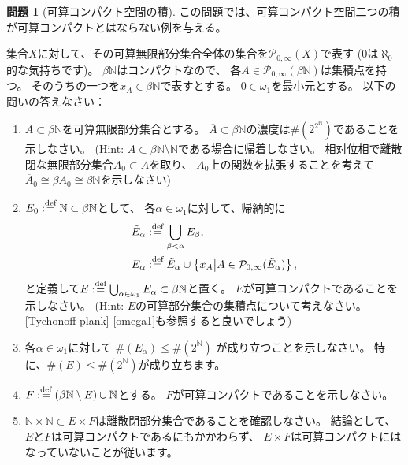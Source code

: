 \documentclass[uplatex]{jsarticle}
\theoremstyle{definition}
\newtheorem{prob}[prob]{問題}
\newcommand{\dfn}{:\overset{\mbox{{\scriptsize def}}}{=}}
\newcommand{\N}{\mathbb{N}}
\newcommand{\mcP}{\mathcal{P}}
\begin{document}
\begin{prob}[可算コンパクト空間の積]\label{prod cntb cpt}
  この問題では、可算コンパクト空間二つの積が可算コンパクトとはならない例を与える。

  集合\(X\)に対して、その可算無限部分集合全体の集合を\(\mcP_{0,\infty}(X)\)で表す
  (\(0\)は\(\aleph_0\)的な気持ちです)。
  \(\beta \N\)はコンパクトなので、
  各\(A\in \mcP_{0,\infty}(\beta \N)\)は集積点を持つ。
  そのうちの一つを\(x_A\in \beta \N\)で表すとする。
  \(0\in\omega_1\)を最小元とする。
  以下の問いの答えなさい：
  \begin{enumerate}
    \item
    \(A\subset \beta \N\)を可算無限部分集合とする。
    \(\overline{A}\subset \beta \N\)の濃度は\(\#(2^{2^{\N}})\)であることを示しなさい。
    (Hint: \(A\subset \beta \N\setminus \N\)である場合に帰着しなさい。
    相対位相で離散閉な無限部分集合\(A_0\subset A\)を取り、
    \(A_0\)上の関数を拡張することを考えて
    \(\overline{A}_0\cong \beta A_0 \cong \beta \N\)を示しなさい)
    \item
    \(E_0\dfn \N\subset \beta \N\)として、
    各\(\alpha \in \omega_1\)に対して、帰納的に
    \begin{align*}
      \tilde{E}_{\alpha} &\dfn \bigcup_{\beta<\alpha}E_{\beta}, \\
      E_{\alpha} &\dfn \tilde{E}_{\alpha} \cup
      \left\{ x_A \middle| A \in \mcP_{0,\infty}(\tilde{E}_{\alpha})\right\},
    \end{align*}
    と定義して\(E\dfn \bigcup_{\alpha\in\omega_1} E_{\alpha}\subset \beta \N\)と置く。
    \(E\)が可算コンパクトであることを示しなさい。
    (Hint: \(E\)の可算部分集合の集積点について考えなさい。
    \autoref{Tychonoff plank} \ref{omega1}も参照すると良いでしょう)
    \item
    各\(\alpha\in\omega_1\)に対して
    \(\#(E_{\alpha}) \leq \#(2^{\N})\)
    が成り立つことを示しなさい。
    特に、\(\#(E) \leq \#(2^{\N})\)が成り立ちます。
    \item
    \(F \dfn (\beta \N \setminus E)\cup \N\)とする。
    \(F\)が可算コンパクトであることを示しなさい。
    \item
    \(\N\times \N\subset E\times F\)は離散閉部分集合であることを確認しなさい。
    結論として、\(E\)と\(F\)は可算コンパクトであるにもかかわらず、
    \(E\times F\)は可算コンパクトにはなっていないことが従います。
  \end{enumerate}
\end{prob}
\end{document}
